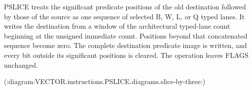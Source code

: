 PSLICE treats the significant predicate positions of the old destination followed by those of the source as one sequence of selected B, W, L, or Q typed lanes.
It writes the destination from a window of the architectural typed-lane count beginning at the unsigned immediate count.
Positions beyond that concatenated sequence become zero.
The complete destination predicate image is written, and every bit outside its significant positions is cleared.
The operation leaves FLAGS unchanged.

(:diagram:VECTOR.instructions.PSLICE.diagrams.slice-by-three:)
